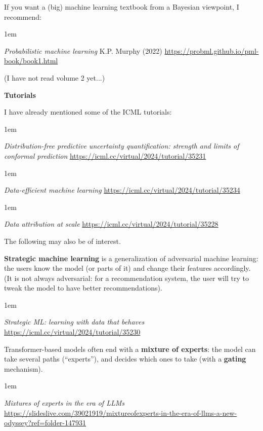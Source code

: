 \documentclass[a5paper]{article}
\let\d\textbf
\newenvironment{reference}{%
  \medskip\goodbreak
  \parskip 0pt
  \raggedright
  \leftskip 1em
  \obeylines
}{\par\medskip\goodbreak}
\def\subsection#1{{\par\bigskip\goodbreak\large\bfseries #1\par}}
\begin{document}
If you want a (big) machine learning textbook
from a Bayesian viewpoint, I recommend: 

\begin{reference}
  \emph{Probabilistic machine learning}
  K.P. Murphy (2022)
  \url{https://probml.github.io/pml-book/book1.html}
\end{reference}

(I have not read volume 2 yet...)
  
\subsection{Tutorials}

I have already mentioned some of the ICML tutorials: 

\begin{reference}
  \emph{Distribution-free predictive uncertainty quantification: strength and limits of conformal prediction}
  \url{https://icml.cc/virtual/2024/tutorial/35231}
\end{reference}

\begin{reference}
  \emph{Data-efficient machine learning}
  \url{https://icml.cc/virtual/2024/tutorial/35234}
\end{reference}

\begin{reference}
  \emph{Data attribution at scale}
  \url{https://icml.cc/virtual/2024/tutorial/35228}
\end{reference}

The following may also be of interest.

\d{Strategic machine learning} is a generalization of adversarial machine learning:
the users know the model (or parts of it) and change their features accordingly.
(It is not always adversarial: for a recommendation system, the user will try
to tweak the model to have better recommendations).

\begin{reference}
  \emph{Strategic ML: learning with data that behaves}
  \url{https://icml.cc/virtual/2024/tutorial/35230}
\end{reference}

Transformer-based models often end with a \d{mixture of experts}:
the model can take several paths (``experts''), 
and decides which ones to take (with a \d{gating} mechanism).

\begin{reference}
  \emph{Mixtures of experts in the era of LLMs}
  \url{https://slideslive.com/39021919/mixtureofexperts-in-the-era-of-llms-a-new-odyssey?ref=folder-147931}
\end{reference}
\end{document}
